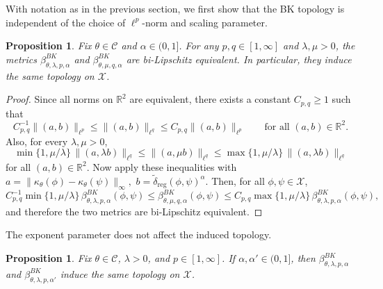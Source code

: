 \documentclass[11pt]{amsart}
\newtheorem{proposition}[theorem]{Proposition}
\theoremstyle{definition}
\theoremstyle{remark}
\newcommand{\R}{\mathbb R}
\newcommand{\1}{\mathbbm{1}}
\begin{document}
With notation as in the previous section, we first show that the BK topology is independent of the choice of $\ell^p$-norm and scaling parameter.
\begin{proposition}
\label{prop:p-lambda-equivalent}
Fix $\theta\in \mathcal C$ and $\alpha\in(0,1]$. For any $p,q\in[1,\infty]$ and $\lambda,\mu>0$,
the metrics $\beta^{BK}_{\theta,\lambda,p,\alpha}$ and $\beta^{BK}_{\theta,\mu,q,\alpha}$ are bi-Lipschitz equivalent.
In particular, they induce the same topology on $\mathcal X$.
\end{proposition}
\begin{proof}
Since all norms on $\R^2$ are equivalent, there exists a constant $C_{p,q}\ge 1$ such that
\[
C_{p,q}^{-1}\|(a,b)\|_{\ell^p}\le \|(a,b)\|_{\ell^q}\le C_{p,q}\|(a,b)\|_{\ell^p}
\qquad\text{for all }(a,b)\in\R^2.
\]
Also, for every $\lambda,\mu>0$,
\[
\min\{1,\mu/\lambda\}\,\|(a,\lambda b)\|_{\ell^q}
\le
\|(a,\mu b)\|_{\ell^q}
\le
\max\{1,\mu/\lambda\}\,\|(a,\lambda b)\|_{\ell^q}
\]
for all $(a,b)\in\R^2$. Now apply these inequalities with $a=\|\kappa_\theta(\phi)-\kappa_\theta(\psi)\|_\infty,$
$b=\widetilde\delta_{\mathrm{reg}}(\phi,\psi)^\alpha.$
Then, for all $\phi,\psi\in\mathcal X$,
\[
C_{p,q}^{-1}\min\{1,\mu/\lambda\}\,
\beta^{BK}_{\theta,\lambda,p,\alpha}(\phi,\psi)
\le
\beta^{BK}_{\theta,\mu,q,\alpha}(\phi,\psi)
\le
C_{p,q}\max\{1,\mu/\lambda\}\,
\beta^{BK}_{\theta,\lambda,p,\alpha}(\phi,\psi),
\]
and therefore the two metrics are bi-Lipschitz equivalent.
\end{proof}

The exponent parameter does not affect the induced topology.
\begin{proposition}\label{prop:alpha-topology}
Fix $\theta\in \mathcal C$, $\lambda>0$, and $p\in[1,\infty]$. If $\alpha,\alpha'\in(0,1]$, then
$\beta^{BK}_{\theta,\lambda,p,\alpha}$ and $\beta^{BK}_{\theta,\lambda,p,\alpha'}$ induce the same topology on $\mathcal X$.
\end{proposition}
\end{document}
